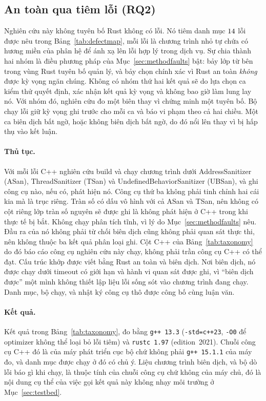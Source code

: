 \subsection{An toàn qua tiêm lỗi (RQ2)}\label{sec:safetyresults}
Nghiên cứu này không tuyên bố Rust không có lỗi. Nó tiêm danh mục
$14$ lỗi được nêu
trong Bảng~\ref{tab:defectmap}, mỗi lỗi là chương trình nhỏ tự chứa
có hương miền của phân hệ để ánh xạ lên lỗi hợp lý trong dịch vụ. Sự chia
thành hai nhóm là điều phương pháp của Mục~\ref{sec:methodfaults} bật: bảy
lớp từ bên trong vùng Rust tuyên bố quản lý, và bảy chọn chính xác vì Rust an toàn
\emph{không} được kỳ vọng ngăn chúng. Không có nhóm thứ hai kết quả
sẽ do lựa chọn ca kiểm thử quyết định, xác nhận kết quả kỳ vọng và không bao giờ làm lung lay
nó. Với nhóm đó, nghiên cứu đo một biên thay vì chứng minh một tuyên bố. Bộ chạy lỗi
giữ kỳ vọng ghi trước cho mỗi ca và báo vi phạm theo
cả hai chiều. Một ca biên dịch bất ngờ, hoặc không biên dịch bất ngờ, do đó nổi lên
thay vì bị hấp thụ vào kết luận.

\paragraph{Thủ tục.}
Với mỗi lỗi C++ nghiên cứu build và chạy chương trình dưới AddressSanitizer (ASan),
ThreadSanitizer (TSan) và UndefinedBehaviorSanitizer (UBSan), và ghi công cụ nào, nếu có,
phát hiện nó. Công cụ thứ ba không phải tinh chỉnh hai cái kia mà là trục riêng. Tràn số có dấu
vô hình với cả ASan và TSan, nên không có cột riêng lớp tràn số nguyên
sẽ được ghi là không phát hiện ở C++ trong khi thực tế bị bắt. Không chạy phân tích tĩnh,
vì lý do Mục~\ref{sec:methodfaults} nêu. Đầu ra của nó không phải từ chối
biên dịch cũng không phải quan sát thực thi, nên không thuộc
ba kết quả phân loại ghi. Cột C++ của Bảng~\ref{tab:taxonomy} do đó
báo cáo công cụ nghiên cứu này chạy, không phải trần công cụ C++ có thể đạt. Cấu trúc
khớp được viết bằng Rust an toàn và biên dịch. Nơi biên dịch, nó được chạy
dưới timeout có giới hạn và hành vi quan sát được ghi, vì ``biên dịch được'' một mình
không thiết lập liệu lỗi sống sót vào chương trình đang chạy. Danh mục, bộ chạy,
và nhật ký công cụ thô được công bố cùng luận văn.

\paragraph{Kết quả.}
Kết quả trong Bảng~\ref{tab:taxonomy}, đo bằng \texttt{g++~13.3}
(\texttt{-std=c++23}, \texttt{-O0} để optimizer không thể loại bỏ lỗi tiêm) và
\texttt{rustc~1.97} (edition~2021). Chuỗi công cụ C++ đó là của máy phát triển cục bộ
chứ không phải \texttt{g++~15.1.1} của máy đo, và danh mục được chạy ở đó
có chủ ý. Liệu chương trình biên dịch, và bộ dò lỗi báo gì khi chạy, là
thuộc tính của chuỗi công cụ chứ không của máy chủ, đó là nội dung cụ thể
của việc gọi kết quả này không nhạy môi trường ở
Mục~\ref{sec:testbed}.

